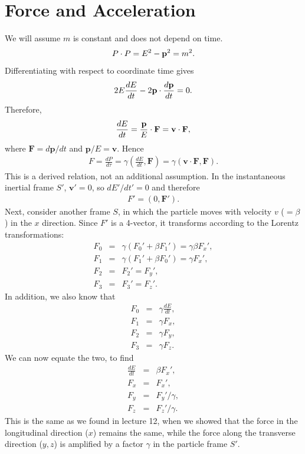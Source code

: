 \documentclass[12pt]{article}
\newcommand{\be}{\begin{eqnarray}}
\newcommand{\ee}{\end{eqnarray}}
\begin{document}
\section{Force and Acceleration}\label{sec:F&A}
We will assume $m$ is constant and does not depend on time.
\be
P\cdot P=E^2-{\bf p}^2=m^2.
\ee
Differentiating with respect to coordinate time gives
\be
2E\frac{dE}{dt}-2{\bf p}\cdot\frac{d{\bf p}}{dt}=0.
\ee
Therefore,
\be
\frac{dE}{dt}=\frac{\bf p}{E}\cdot{\bf F}={\bf v}\cdot{\bf F},
\ee
where $\mathbf F=d\mathbf p/dt$ and $\mathbf p/E=\mathbf v$. Hence
\be
F=\frac{dP}{d\tau}
=\gamma\left(\frac{dE}{dt},\mathbf F\right)
=\gamma\left(\mathbf v\cdot\mathbf F,\mathbf F\right).
\ee
This is a derived relation, not an additional assumption. In the instantaneous inertial frame $S'$, $\mathbf v'=0$, so $dE'/dt'=0$ and therefore
\be
F'=(0,\mathbf F').
\ee
Next, consider another frame $S$, in which the particle moves with velocity $v$ ($=\beta$) in the $x$ direction. Since $F'$ is a 4-vector, it transforms according to the Lorentz transformations:
\be
F_0 &=& \gamma(F_0' + \beta F_1') = \gamma \beta F_x', \nonumber \\
F_1 &=& \gamma(F_1' + \beta F_0')  = \gamma F_x', \nonumber \\
F_2 &=& F_2' = F_y',\nonumber \\
F_3 &=& F_3' = F_z'.
\ee
In addition, we also know that 
\be
F_0 &=& \gamma \frac{dE}{dt}, \nonumber \\
F_1 &=& \gamma F_x, \nonumber \\
F_2 &=& \gamma F_y, \nonumber \\
F_3 &=& \gamma F_z.
\ee
We can now equate the two, to find 
\be
\frac{dE}{dt} &=& \beta F_x', \nonumber \\
F_x &=& F_x',\nonumber \\
F_y &=& F_y' /\gamma,\nonumber \\
F_z &=& F_z'/\gamma. 
\ee
This is the same as we found in lecture 12, when we showed that the force in the longitudinal direction ($x$) remains the same, while the force along the transverse direction ($y,z$) is amplified by a factor $\gamma$ in the particle frame $S'$. 
\end{document}

